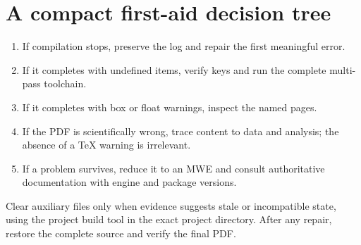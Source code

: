 \section*{A compact first-aid decision tree}

\begin{enumerate}
  \item If compilation stops, preserve the log and repair the first meaningful
        error.
  \item If it completes with undefined items, verify keys and run the complete
        multi-pass toolchain.
  \item If it completes with box or float warnings, inspect the named pages.
  \item If the PDF is scientifically wrong, trace content to data and analysis;
        the absence of a TeX warning is irrelevant.
  \item If a problem survives, reduce it to an MWE and consult authoritative
        documentation with engine and package versions.
\end{enumerate}

Clear auxiliary files only when evidence suggests stale or incompatible state,
using the project build tool in the exact project directory. After any repair,
restore the complete source and verify the final PDF.
